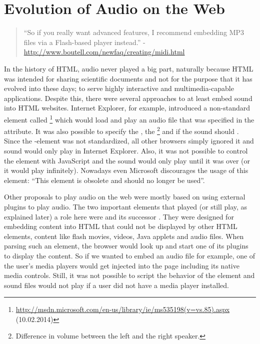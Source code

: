 
\section{Evolution of Audio on the Web}
\label{sec:webaudio-evolution}

\begin{quote}
  ``So if you really want advanced features, I recommend embedding MP3 files via a Flash-based player instead.'' - \url{http://www.boutell.com/newfaq/creating/midi.html}
\end{quote}

In the history of HTML, audio never played a big part, naturally because HTML was intended for sharing scientific documents and not for the purpose that it has evolved into these days; to serve highly interactive and multimedia-capable applications. Despite this, there were several approaches to at least embed sound into HTML websites. Internet Explorer, for example, introduced a non-standard element called \footnote{\url{http://msdn.microsoft.com/en-us/library/ie/ms535198(v=vs.85).aspx} (10.02.2014)} which would load and play an audio file that was specified in the  attribute. It was also possible to specify the , the \footnote{Difference in volume between the left and the right speaker.} and if the sound should . Since the -element was not standardized, all other browsers simply ignored it and sound would only play in Internet Explorer. Also, it was not possible to control the element with JavaScript and the sound would only play until it was over (or it would play infinitely). Nowadays even Microsoft discourages the usage of this element: ``This element is obsolete and should no longer be used''. \cite{msdn2014bgsound}

Other proposals to play audio on the web were mostly based on using external plugins to play audio. The two important elements that played (or still play, as explained later) a role here were  and its successor . They were designed for embedding content into HTML that could not be displayed by other HTML elements, content like flash movies, videos, Java applets and audio files. When parsing such an element, the browser would look up and start one of its plugins to display the content. So if we wanted to embed an audio file for example, one of the user's media players would get injected into the page including its native media controls. Still, it was not possible to script the behavior of the element and sound files would not play if a user did not have a media player installed. \cite[The embed element]{w32014html5}

